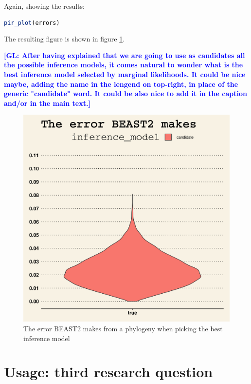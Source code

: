 \documentclass{article}
\newcommand{\giovanni}[1]{\textcolor{blue}{\textbf{[GL: #1]}}}
\begin{document}
Again, showing the results:

\begin{lstlisting}[language=R, floatplacement=H, frame=single]
pir_plot(errors)
\end{lstlisting}

The resulting figure is shown in figure \ref{fig:example_2}.

\giovanni{After having explained that we are going to use as candidates all the possible inference models, it comes natural to wonder what is the best inference model selected by marginal likelihoods. It could be nice maybe, adding the name in the lengend on top-right, in place of the generic "candidate" word. It could be also nice to add it in the caption and/or in the main text.}

\begin{figure}[h]
  \includegraphics[width=\textwidth]{figure_example_2.png}
  \caption{
    The error BEAST2 makes from a phylogeny when
    picking the best inference model
  }
  \label{fig:example_2}
\end{figure}

\section{Usage: third research question}
\end{document}
